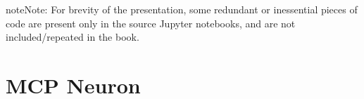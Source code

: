 \documentclass[letterpaper,10pt,english]{jupyterBook}
\begin{document}
\begin{sphinxVerbatim}[commandchars=\\\{\}]
                   
 

           
\end{sphinxVerbatim}

\begin{sphinxadmonition}{note}{Note:}
\sphinxAtStartPar
For brevity of the presentation, some redundant or inessential pieces of code are present only in the source Jupyter notebooks, and are not included/repeated in the book.
\end{sphinxadmonition}


\chapter{MCP Neuron}
\label{\detokenize{docs/mcp:mcp-neuron}}\label{\detokenize{docs/mcp:mcp-lab}}\label{\detokenize{docs/mcp::doc}}
\end{document}
